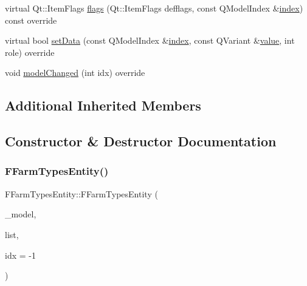 \begin{DoxyCompactItemize}
\item 
virtual Qt\+::\+Item\+Flags \mbox{\hyperlink{classobjecttree_1_1_f_farm_types_entity_a90cf36929e178b9853e30e88fd9af9cb}{flags}} (Qt\+::\+Item\+Flags defflags, const Q\+Model\+Index \&\mbox{\hyperlink{classobjecttree_1_1_f_farm_types_entity_af2a94ebd0631e46e494a87e60153bde9}{index}}) const override
\item 
virtual bool \mbox{\hyperlink{classobjecttree_1_1_f_farm_types_entity_a60e1138f24803cc605c001ae2351d6b8}{set\+Data}} (const Q\+Model\+Index \&\mbox{\hyperlink{classobjecttree_1_1_f_farm_types_entity_af2a94ebd0631e46e494a87e60153bde9}{index}}, const Q\+Variant \&\mbox{\hyperlink{diffusion_8cpp_a4b41795815d9f3d03abfc739e666d5da}{value}}, int role) override
\item 
void \mbox{\hyperlink{classobjecttree_1_1_f_farm_types_entity_a8abefd5918712d86ef6c678fbdc611e8}{model\+Changed}} (int idx) override
\end{DoxyCompactItemize}
\subsection*{Additional Inherited Members}


\subsection{Constructor \& Destructor Documentation}
\mbox{\label{classobjecttree_1_1_f_farm_types_entity_ab24ece064bb4df8d5f414079a1b947dc}} 
\subsubsection{\texorpdfstring{FFarmTypesEntity()}{FFarmTypesEntity()}}
{\footnotesize\ttfamily F\+Farm\+Types\+Entity\+::\+F\+Farm\+Types\+Entity (\begin{DoxyParamCaption}\item[{\mbox{\hyperlink{class_object_tree_model}{Object\+Tree\+Model}} $\ast$}]{\+\_\+model,  }\item[{std\+::shared\+\_\+ptr$<$ \mbox{\hyperlink{class_interesting_list_with_special_values}{Interesting\+List\+With\+Special\+Values}}$<$ int $>$$>$}]{list,  }\item[{int}]{idx = {\ttfamily -\/1} }\end{DoxyParamCaption})\hspace{0.3cm}{\ttfamily [explicit]}}



